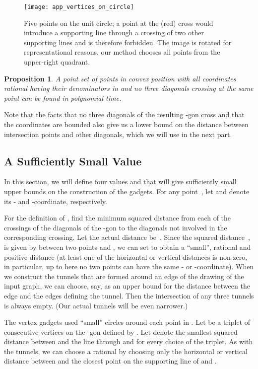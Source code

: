 \documentclass[11pt,a4paper]{article}
\newtheorem{proposition}[theorem]{Proposition}
\begin{document}
\begin{figure}
\centering
\texttt{[image: app\_vertices\_on\_circle]}
\caption{Five points on the unit circle; a point at the (red) cross would introduce a supporting line through a crossing of two other supporting lines and is therefore forbidden.
The image is rotated for representational reasons, our method chooses all points from the upper-right quadrant.
}
\label{fig_app_vertices_on_circle}
\end{figure}


\begin{proposition}
A point set of  points in convex position with all coordinates rational having their denominators in  and no three diagonals crossing at the same point can be found in polynomial time.
\end{proposition}

Note that the facts that no three diagonals of the resulting -gon cross and that the coordinates are bounded also give us a lower bound on the distance between intersection points and other diagonals, which we will use in the next part.



\subsection{A Sufficiently Small Value}
In this section, we will define four values  and  that will give sufficiently small upper bounds on the construction of the gadgets.
For any point~, let  and  denote its - and -coordinate, respectively.

For the definition of , find the minimum squared distance from each of the  crossings of the diagonals of the -gon to the diagonals not involved in the corresponding crossing.
Let the actual distance be~.
Since the squared distance~, is given by  between two points  and , we can set  to obtain a ``small'', rational and positive distance  (at least one of the horizontal or vertical distances is non-zero, in particular, up to here no two points can have the same - or -coordinate).
When we construct the tunnels that are formed around an edge of the drawing of the input graph, we can choose, say,  as an upper bound for the distance between the edge and the edges defining the tunnel.
Then the intersection of any three tunnels is always empty.
(Our actual tunnels will be even narrower.)

The vertex gadgets used ``small'' circles around each point in .
Let  be a triplet of consecutive vertices on the -gon defined by .
Let  denote the smallest squared distance between  and the line through  and  for every choice of the triplet.
As with the tunnels, we can choose a rational  by choosing only the horizontal or vertical distance between  and the closest point on the supporting line of  and .
\end{document}

